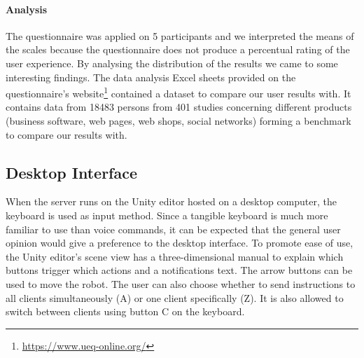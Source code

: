 \paragraph{Analysis}
The questionnaire was applied on 5 participants and we interpreted the means of the scales because the questionnaire does not produce a percentual rating of the user experience. By analysing the distribution of the results we came to some interesting findings.
The data analysis Excel sheets provided on the questionnaire's website\footnote{\protect\url{https://www.ueq-online.org/}} contained a dataset to compare our user results with. It contains data from 18483 persons from 401 studies concerning different products (business software, web pages, web shops, social networks) forming a benchmark to compare our results with.

\subsection{Desktop Interface }
When the server runs on the Unity editor hosted on a desktop computer, the keyboard is used as input method. Since a tangible keyboard is much more familiar to use than voice commands, it can be expected that the general user opinion would give a preference to the desktop interface. To promote ease of use, the Unity editor's scene view has a three-dimensional manual to explain which buttons trigger which actions and a notifications text. The arrow buttons can be used to move the robot. The user can also choose whether to send instructions to all clients simultaneously (A) or one client specifically (Z). It is also allowed to switch between clients using button C on the keyboard.


